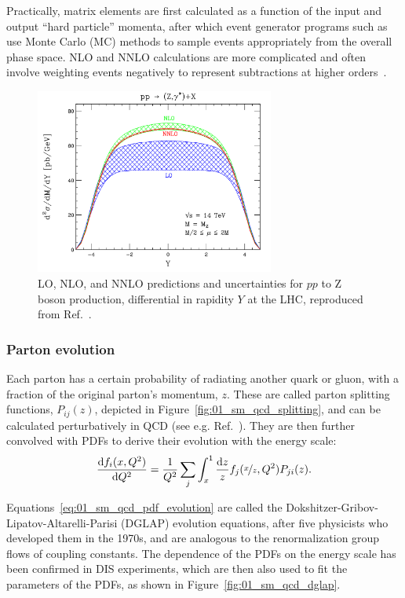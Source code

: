 Practically, matrix elements are first calculated as a function of the input and output ``hard particle'' momenta, after which event generator programs such as \MADGRAPH~\cite{Alwall:2014hca} use Monte Carlo (MC) methods to sample events appropriately from the overall phase space.
NLO and NNLO calculations are more complicated and often involve weighting events negatively to represent subtractions at higher orders~\cite{Danziger:2021xvr}.

\begin{figure}[ht]
	\centering
	\includegraphics[width=0.7\textwidth]{figures/01-SM-03-SM/qcd/Zxs.png}
	\caption{LO, NLO, and NNLO predictions and uncertainties for $pp$ to Z boson production, differential in rapidity $Y$ at the LHC, reproduced from Ref.~\cite{Anastasiou:2003ds}.}
	\label{fig:01_sm_qcd_qcd_nlo}
\end{figure}


\subsubsection{Parton evolution}

Each parton has a certain probability of radiating another quark or gluon, with a fraction of the original parton's momentum, $z$.
These are called parton splitting functions, $P_{ij}(z)$, depicted in Figure~\ref{fig:01_sm_qcd_splitting}, and can be calculated perturbatively in QCD (see e.g. Ref.~\cite{Salam:2010zt}).
They are then further convolved with PDFs to derive their evolution with the energy scale:
\begin{equation}
	\label{eq:01_sm_qcd_pdf_evolution}
	\frac{\dd f_i(x, Q^2)}{\dd Q^2} = \frac{1}{Q^2} \sum_{j} \int_x^1 \frac{\dd z}{z} f_j(\cnicefrac{x}{z}, Q^2) P_{ji}(z).
\end{equation}

Equations~\ref{eq:01_sm_qcd_pdf_evolution} are called the Dokshitzer-Gribov-Lipatov-Altarelli-Parisi (DGLAP) evolution equations, after five physicists who developed them in the 1970s, and are analogous to the renormalization group flows of coupling constants.
The dependence of the PDFs on the energy scale has been confirmed in DIS experiments, which are then also used to fit the parameters of the PDFs, as shown in Figure~\ref{fig:01_sm_qcd_dglap}.

